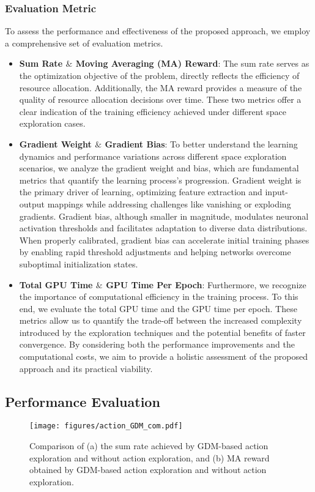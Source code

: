 \documentclass[comsoc,journal]{IEEEtran}
\begin{document}
\subsubsection{Evaluation Metric}
To assess the performance and effectiveness of the proposed approach, we employ a comprehensive set of evaluation metrics. 
\begin{itemize}
    \item \textbf{Sum Rate $\&$ Moving Averaging (MA) Reward\cite{zhou2024federated}}: The sum rate serves as the optimization objective of the problem, directly reflects the efficiency of resource allocation. Additionally, the MA reward provides a measure of the quality of resource allocation decisions over time. These two metrics offer a clear indication of the training efficiency achieved under different space exploration cases.
    \item \textbf{Gradient Weight $\&$ Gradient Bias}: To better understand the learning dynamics and performance variations across different space exploration scenarios, we analyze the gradient weight and bias, which are fundamental metrics that quantify the learning process's progression. Gradient weight is the primary driver of learning, optimizing feature extraction and input-output mappings while addressing challenges like vanishing or exploding gradients. Gradient bias, although smaller in magnitude, modulates neuronal activation thresholds and facilitates adaptation to diverse data distributions. When properly calibrated, gradient bias can accelerate initial training phases by enabling rapid threshold adjustments and helping networks overcome suboptimal initialization states. 
    \item \textbf{Total GPU Time $\&$ GPU Time Per Epoch}: Furthermore, we recognize the importance of computational efficiency in the training process. To this end, we evaluate the total GPU time and the GPU time per epoch. These metrics allow us to quantify the trade-off between the increased complexity introduced by the exploration techniques and the potential benefits of faster convergence. By considering both the performance improvements and the computational costs, we aim to provide a holistic assessment of the proposed approach and its practical viability.
\end{itemize}
\vspace{-8pt}
\subsection{Performance Evaluation}
\begin{figure}[t]
    \centering
    \texttt{[image: figures/action\_GDM\_com.pdf]}
    \caption{Comparison of (a) the sum rate achieved by GDM-based action exploration and without action exploration, and (b) MA reward obtained by GDM-based action exploration and without action exploration.
   }  
    \label{fig:sum_rate_reward_action_com}
\end{figure}
\vspace{-5pt}
\end{document}
